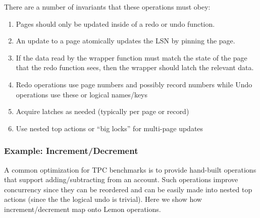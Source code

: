 \documentclass[letterpaper,twocolumn,english]{article}
\newcommand{\yad}{Lemon\xspace}
\begin{document}
There are a number of invariants that these operations must obey:
\begin{enumerate}
\item Pages should only be updated inside of a redo or undo function.
\item An update to a page atomically updates the LSN by pinning the page.
\item If the data read by the wrapper function must match the state of
the page that the redo function sees, then the wrapper should latch
the relevant data.
\item Redo operations use page numbers and possibly record numbers
while Undo operations use these or logical names/keys
\item Acquire latches as needed (typically per page or record)
\item Use nested top actions or ``big locks'' for multi-page updates
\end{enumerate}

\subsubsection{Example: Increment/Decrement}

A common optimization for TPC benchmarks is to provide hand-built
operations that support adding/subtracting from an account.  Such
operations improve concurrency since they can be reordered and can be
easily made into nested top actions (since the the logical undo is
trivial). Here we show how increment/decrement map onto \yad operations.
\end{document}
